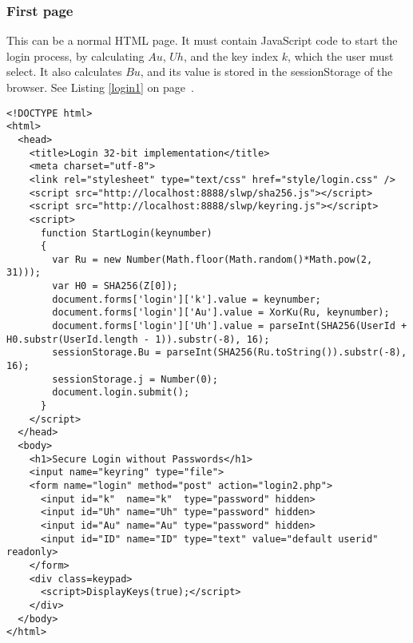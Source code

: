 \subsubsection{First page}
This can be a normal HTML page.
It must contain JavaScript code to start the login process,
by calculating $Au$, $Uh$, and the key index $k$, which the user must select.
It also calculates $Bu$, and its value is stored in the sessionStorage of the browser.
See Listing \ref{login1} on page~\pageref{login1}.
\lstset{language=HTML,basicstyle=\footnotesize\ttfamily}
\begin{lstlisting}[breaklines=true,frame=lines,float=tbhp,label=login1,title=login.html,caption=Initial Login Page]
<!DOCTYPE html>
<html>
  <head>
    <title>Login 32-bit implementation</title>
    <meta charset="utf-8">
    <link rel="stylesheet" type="text/css" href="style/login.css" />
    <script src="http://localhost:8888/slwp/sha256.js"></script>
    <script src="http://localhost:8888/slwp/keyring.js"></script>
    <script>
      function StartLogin(keynumber)
      {
        var Ru = new Number(Math.floor(Math.random()*Math.pow(2, 31)));
        var H0 = SHA256(Z[0]);
        document.forms['login']['k'].value = keynumber;
        document.forms['login']['Au'].value = XorKu(Ru, keynumber);
        document.forms['login']['Uh'].value = parseInt(SHA256(UserId + H0.substr(UserId.length - 1)).substr(-8), 16);
        sessionStorage.Bu = parseInt(SHA256(Ru.toString()).substr(-8), 16);
        sessionStorage.j = Number(0);
        document.login.submit();
      }
    </script>
  </head>
  <body>
    <h1>Secure Login without Passwords</h1>
    <input name="keyring" type="file">
    <form name="login" method="post" action="login2.php">
      <input id="k"  name="k"  type="password" hidden>
      <input id="Uh" name="Uh" type="password" hidden>
      <input id="Au" name="Au" type="password" hidden>
      <input id="ID" name="ID" type="text" value="default userid" readonly>
    </form>
    <div class=keypad>
      <script>DisplayKeys(true);</script>
    </div>
  </body>
</html>
\end{lstlisting}

